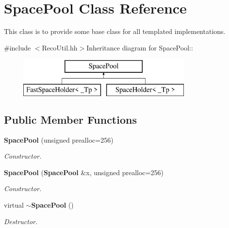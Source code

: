 \section{SpacePool Class Reference}
\label{classSpacePool}


This class is to provide some base class for all templated implementations.  


{\ttfamily \#include $<$RecoUtil.hh$>$}Inheritance diagram for SpacePool::\begin{figure}[H]
\begin{center}
\leavevmode
\includegraphics[height=2cm]{classSpacePool}
\end{center}
\end{figure}
\subsection*{Public Member Functions}
\begin{DoxyCompactItemize}
\item 
{\bf SpacePool} (unsigned prealloc=256)\label{classSpacePool_a4778bf95fa19030a2eda2b9652ca66fb}

\begin{DoxyCompactList}\small\item\em Constructor. \item\end{DoxyCompactList}\item 
{\bf SpacePool} ({\bf SpacePool} \&x, unsigned prealloc=256)\label{classSpacePool_ae5816739b4f2ed2b1a41a989e692a644}

\begin{DoxyCompactList}\small\item\em Constructor. \item\end{DoxyCompactList}\item 
virtual {\bf $\sim$SpacePool} ()\label{classSpacePool_a8ddca1507b0d3112b5304572d4a83f97}

\begin{DoxyCompactList}\small\item\em Destructor. \item\end{DoxyCompactList}\end{DoxyCompactItemize}
